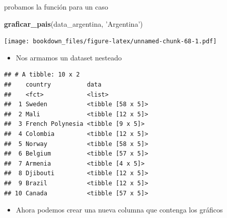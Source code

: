 \documentclass[]{book}
\newenvironment{Shaded}{\begin{snugshade}}{\end{snugshade}}
\newcommand{\DataTypeTok}[1]{\textcolor[rgb]{0.13,0.29,0.53}{#1}}
\newcommand{\DecValTok}[1]{\textcolor[rgb]{0.00,0.00,0.81}{#1}}
\newcommand{\KeywordTok}[1]{\textcolor[rgb]{0.13,0.29,0.53}{\textbf{#1}}}
\newcommand{\NormalTok}[1]{#1}
\newcommand{\OperatorTok}[1]{\textcolor[rgb]{0.81,0.36,0.00}{\textbf{#1}}}
\newcommand{\StringTok}[1]{\textcolor[rgb]{0.31,0.60,0.02}{#1}}
\providecommand{\tightlist}{%
  \setlength{\itemsep}{0pt}\setlength{\parskip}{0pt}}
\begin{document}
probamos la función para un caso

\begin{Shaded}
\begin{Highlighting}[]
\KeywordTok{graficar_pais}\NormalTok{(data_argentina, }\StringTok{'Argentina'}\NormalTok{)}
\end{Highlighting}
\end{Shaded}

\texttt{[image: bookdown\_files/figure-latex/unnamed-chunk-68-1.pdf]}

\begin{itemize}
\tightlist
\item
  Nos armamos un dataset nesteado
\end{itemize}

\begin{Shaded}
\end{Shaded}

\begin{verbatim}
## # A tibble: 10 x 2
##    country          data             
##    <fct>            <list>           
##  1 Sweden           <tibble [58 x 5]>
##  2 Mali             <tibble [12 x 5]>
##  3 French Polynesia <tibble [9 x 5]> 
##  4 Colombia         <tibble [12 x 5]>
##  5 Norway           <tibble [58 x 5]>
##  6 Belgium          <tibble [57 x 5]>
##  7 Armenia          <tibble [4 x 5]> 
##  8 Djibouti         <tibble [12 x 5]>
##  9 Brazil           <tibble [12 x 5]>
## 10 Canada           <tibble [57 x 5]>
\end{verbatim}

\begin{itemize}
\tightlist
\item
  Ahora podemos crear una nueva columna que contenga los gráficos
\end{itemize}

\begin{Shaded}
\end{Shaded}
\end{document}
